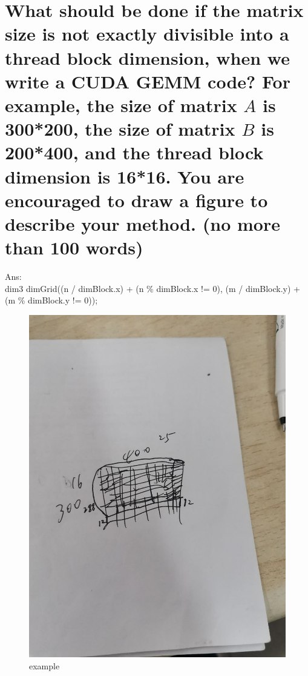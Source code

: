\documentclass{article}
\begin{document}
\section{What should be done if the matrix size is not exactly divisible into a thread block dimension, when we write a CUDA GEMM code? For example, the size of matrix $A$ is 300*200, the size of matrix $B$ is 200*400, and the thread block dimension is 16*16. You are encouraged to draw a figure to describe your method. (no more than 100 words)}

Ans:%
\\ dim3 dimGrid((n / dimBlock.x) + (n \% dimBlock.x != 0), (m / dimBlock.y) + (m \% dimBlock.y != 0));

\begin{figure}[ht]
\centering
\includegraphics[width=5in]{example}
\caption{example}
\end{figure}



\end{document}

